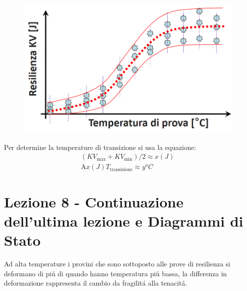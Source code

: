 \documentclass{article}
\begin{document}
{                    \begin{figure}[!h]
                        \centering
                        \includegraphics[width=.85\linewidth]{Diagramma sulla Curva di Transizione nella Resilienza contro temperatura di prova.png}
                    \end{figure}
                    Per determine la temperature di transizione si usa la equazione:
                    \begin{gather*}
                        (KV_\text{max} + KV_\text{min})/2 \approx x (J) \\
                        \text{A} x (J) T_\text{transizione} \approx y^o C
                    \end{gather*}
    \section{Lezione 8 - Continuazione dell'ultima lezione e Diagrammi di Stato}
        Ad alta temperature i provini che sono sottoposto alle prove di resilienza si deformano di pi\'u di quando hanno temperatura pi\'u bassa, la differenza in deformazione rappresenta il cambio da fragilit\'a alla tenacit\'a.
        \newpage
}
\end{document}
